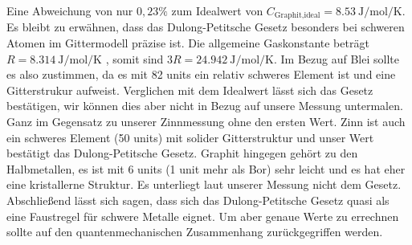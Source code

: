 Eine Abweichung von nur $0,23\%$ zum Idealwert von $C_{\text{Graphit,ideal}}=\SI{8,53}{\joule\per\mol\per\kelvin}$.\cite{wiki}\\
Es bleibt zu erwähnen, dass das Dulong-Petitsche Gesetz besonders bei schweren Atomen im Gittermodell präzise ist.
Die allgemeine Gaskonstante beträgt $R = \SI{8,314}{\joule\per\mol\per\kelvin}$ \cite{codata}, somit sind $3R = \SI{24,942}{\joule\per\mol\per\kelvin}$.
Im Bezug auf Blei sollte es also zustimmen, da es mit 82 units ein relativ schweres Element ist und eine Gitterstrukur aufweist.
Verglichen mit dem Idealwert lässt sich das Gesetz bestätigen, wir können dies aber nicht in Bezug auf unsere Messung untermalen.
Ganz im Gegensatz zu unserer Zinnmessung ohne den ersten Wert.
Zinn ist auch ein schweres Element (50 units) mit solider Gitterstruktur und unser Wert bestätigt das Dulong-Petitsche Gesetz.
Graphit hingegen gehört zu den Halbmetallen, es ist mit 6 units (1 unit mehr als Bor) sehr leicht und es hat eher eine kristallerne Struktur.
Es unterliegt laut unserer Messung nicht dem Gesetz.\\
Abschließend lässt sich sagen, dass sich das Dulong-Petitsche Gesetz quasi als eine Faustregel für schwere Metalle eignet.
Um aber genaue Werte zu errechnen sollte auf den quantenmechanischen Zusammenhang zurückgegriffen werden.
